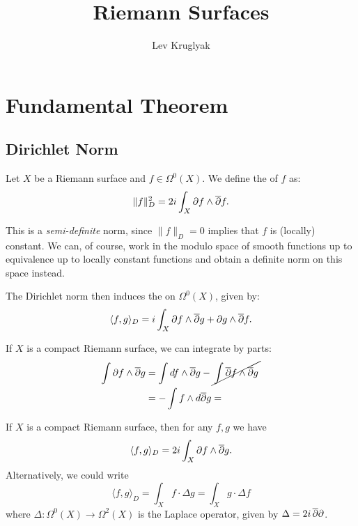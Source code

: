 \documentclass{lkx_paper}
\title{\textbf{Riemann Surfaces}}
\date{}
\author{Lev Kruglyak}
\begin{document}
\maketitle

\section{Fundamental Theorem}


\subsection{Dirichlet Norm}

\begin{definition}
	Let $X$ be a Riemann surface and $f\in \Omega^0(X)$. We define the   of $f$ as:
	\[
		\|f\|_D^2 = 2i\int_X \partial f\wedge \overline{\partial} f.
	\]
\end{definition}

This is a \emph{semi-definite} norm, since $\|f\|_D = 0$ implies that $f$ is (locally) constant. We can, of course, work in the modulo space of smooth functions up to equivalence up to locally constant functions and obtain a definite norm on this space instead.

\begin{definition}
	The Dirichlet norm then induces the  on $\Omega^0(X)$, given by:
	\[
		\langle f, g\rangle_D = i\int_X \partial f \wedge \overline{\partial} g + \partial g\wedge \overline{\partial} f.
	\]
\end{definition}

If $X$ is a compact Riemann surface, we can integrate by parts:
\[
	\begin{aligned}
		\int \partial f \wedge \overline{\partial} g & = \int df\wedge \overline{\partial} g - \cancel{\,\int \overline{\partial} f\wedge \overline{\partial} g\,} \\
		                         & = -\int f\wedge d\overline{\partial} g =
	\end{aligned}
\]

\begin{proposition}
	If $X$ is a compact Riemann surface, then for any $f,g$ we have
	\[
		\langle f, g\rangle_D = 2i\int_X \partial f \wedge \overline{\partial} g.
	\]
	Alternatively, we could write
	\[
		\langle f, g\rangle_D = \int_X f\cdot \Delta g = \int_X g\cdot \Delta f
	\]
	where $\Delta : \Omega^0(X) \to \Omega^2(X)$ is the Laplace operator, given by $\Delta = 2i\,\overline{\partial}\partial$.
\end{proposition}
\end{document}
